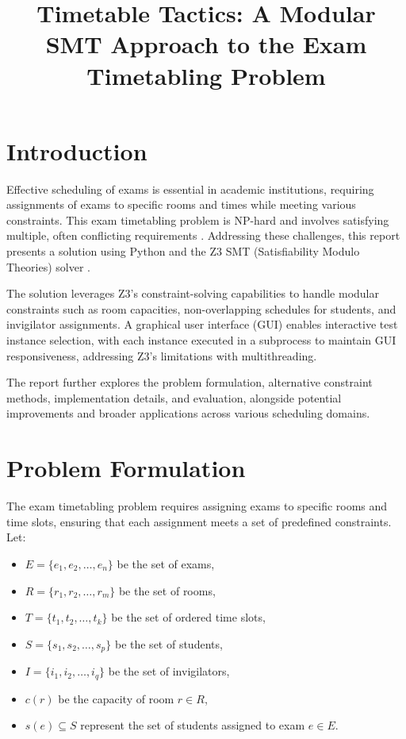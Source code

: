 \documentclass[a4paper]{article}
\title{\textbf{Timetable Tactics: A Modular SMT Approach to the Exam Timetabling Problem}}
\author{}
\date{}
\begin{document}
    \maketitle
    \thispagestyle{fancy}
    \pagestyle{fancy}

    \section{Introduction}
    Effective scheduling of exams is essential in academic institutions, requiring assignments of exams to specific rooms and times while meeting various constraints. This exam timetabling problem is NP-hard and involves satisfying multiple, often conflicting requirements \citep{Muller2016}. Addressing these challenges, this report presents a solution using Python and the Z3 SMT (Satisfiability Modulo Theories) solver \citep{DeMoura2008}.
    
    The solution leverages Z3's constraint-solving capabilities to handle modular constraints such as room capacities, non-overlapping schedules for students, and invigilator assignments. A graphical user interface (GUI) enables interactive test instance selection, with each instance executed in a subprocess to maintain GUI responsiveness, addressing Z3’s limitations with multithreading.
    
    The report further explores the problem formulation, alternative constraint methods, implementation details, and evaluation, alongside potential improvements and broader applications across various scheduling domains.      

    \section{Problem Formulation}
    The exam timetabling problem requires assigning exams to specific rooms and time slots, ensuring that each assignment meets a set of predefined constraints. Let:
    \begin{itemize}
        \item \( E = \{e_1, e_2, \dots, e_n\} \) be the set of exams,
        \item \( R = \{r_1, r_2, \dots, r_m\} \) be the set of rooms,
        \item \( T = \{t_1, t_2, \dots, t_k\} \) be the set of ordered time slots,
        \item \( S = \{s_1, s_2, \dots, s_p\} \) be the set of students,
        \item \( I = \{i_1, i_2, \dots, i_q\} \) be the set of invigilators,
        \item \( c(r) \) be the capacity of room \( r \in R \),
        \item \( s(e) \subseteq S \) represent the set of students assigned to exam \( e \in E \).
    \end{itemize}
    
\end{document}
